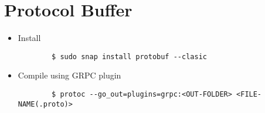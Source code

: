 \section{Protocol Buffer}


	\begin{itemize}
		\item Install
		\begin{verbatim}
		$ sudo snap install protobuf --clasic
		\end{verbatim}
		\item Compile using GRPC plugin
		\begin{verbatim}
		$ protoc --go_out=plugins=grpc:<OUT-FOLDER> <FILE-NAME(.proto)>
		\end{verbatim}
		
	\end{itemize}

